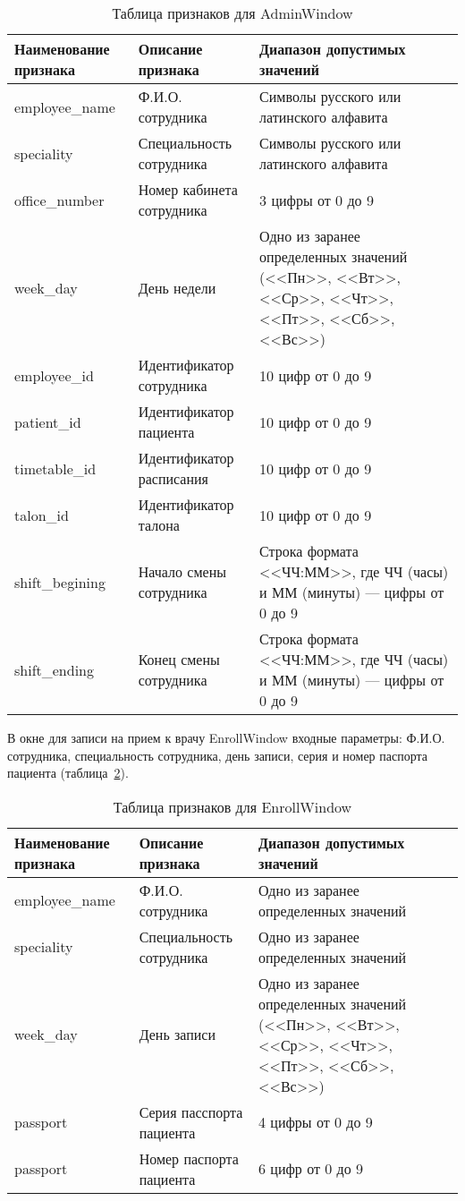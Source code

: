 \begin{table}[ht]
\caption{Таблица признаков для AdminWindow}
\label{tab:tab_1}
\begin{center}
\begin{tabularx}{\linewidth}{|X|X|X|}
\hline
 Наименование признака & Описание признака & Диапазон допустимых значений\\
\hline
 employee\_name & Ф.И.О. сотрудника & Символы русского или латинского алфавита\\
\hline
 speciality & Специальность сотрудника & Символы русского или латинского алфавита\\
\hline
 office\_number & Номер кабинета сотрудника & 3 цифры от 0 до 9\\
\hline
 week\_day & День недели & Одно из заранее определенных значений (<<Пн>>, <<Вт>>, <<Ср>>, <<Чт>>, <<Пт>>, <<Сб>>, <<Вс>>)\\
\hline
 employee\_id & Идентификатор сотрудника & 10 цифр от 0 до 9 \\
\hline
 patient\_id & Идентификатор пациента & 10 цифр от 0 до 9 \\
\hline
 timetable\_id & Идентификатор расписания & 10 цифр от 0 до 9 \\
\hline
 talon\_id & Идентификатор талона & 10 цифр от 0 до 9 \\
\hline
 shift\_begining & Начало смены сотрудника & Строка формата <<ЧЧ:ММ>>, где ЧЧ (часы) и ММ (минуты) --- цифры от 0 до 9 \\
\hline
 shift\_ending & Конец смены сотрудника & Строка формата <<ЧЧ:ММ>>, где ЧЧ (часы) и ММ (минуты) --- цифры от 0 до 9\\
\hline
\end{tabularx}
\end{center}
\end{table}

В окне для записи на прием к врачу EnrollWindow входные параметры: Ф.И.О. сотрудника, специальность сотрудника, день записи, серия и номер паспорта пациента (таблица~\ref{tab:tab_2}). 

\begin{table}[ht]
\caption{Таблица признаков для EnrollWindow}
\label{tab:tab_2}
\begin{center}
\begin{tabularx}{\linewidth}{|X|X|X|}
\hline
 Наименование признака & Описание признака & Диапазон допустимых значений\\
\hline
 employee\_name & Ф.И.О. сотрудника & Одно из заранее определенных значений\\
\hline
 speciality & Специальность сотрудника & Одно из заранее определенных значений\\
\hline
 week\_day & День записи & Одно из заранее определенных значений (<<Пн>>, <<Вт>>, <<Ср>>, <<Чт>>, <<Пт>>, <<Сб>>, <<Вс>>)\\
\hline
 passport & Серия пасспорта пациента & 4 цифры от 0 до 9 \\
\hline
 passport & Номер паспорта пациента & 6 цифр от 0 до 9 \\
\hline
\end{tabularx}
\end{center}
\end{table}

